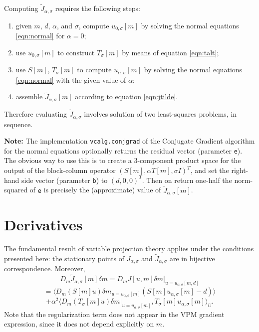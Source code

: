 Computing $\tilde{J}_{\alpha,\sigma}$ requires the following steps:
\begin{enumerate}
\item given $m$, $d$, $\alpha$, and $\sigma$, compute $u_{0,\sigma}[m]$ by solving the normal equations \ref{eqn:normal} for $\alpha=0$;
\item use $u_{0,\sigma}[m]$ to construct $T_{\sigma}[m]$ by means of
  equation \ref{eqn:talt};
\item use $S[m]$, $T_{\sigma}[m]$ to compute $u_{\alpha,\sigma}[m]$ by solving the normal equations \ref{eqn:normal} with the given value of $\alpha$;
\item assemble $\tilde{J}_{\alpha,\sigma}[m]$ according to equation \ref{eqn:jtilde}.
\end{enumerate}

Therefore evaluating $\tilde{J}_{\alpha,\sigma}$ involves solution of
two least-squares problems, in sequence.

{\bf Note:} The implementation {\tt vcalg.conjgrad} of the Conjugate Gradient algorithm for the normal equations optionally returns the residual vector (parameter {\tt e}). The obvious way to use this is to create a 3-component product space for the output of the block-column operator $(S[m],\alpha T[m], \sigma I)^T$, and set the right-hand side vector (parameter {\tt b})
to $(d,0,0)^T$. Then on return one-half the norm-squared of {\tt e} is precisely the (approximate) value of $\tilde{J}_{\alpha,\sigma}[m]$.

\section{Derivatives}
The fundamental result of variable projection theory
\cite[]{GolubPereyra:73} applies under the conditions presented here:
the stationary points of $J_{\alpha,\sigma}$ and
$\tilde{J}_{\alpha,\sigma}$ are in bijective correspondence. Moreover,
\[
D_m\tilde{J}_{\alpha,\sigma}[m]\delta m = D_mJ[u,m]\delta m|_{u =u_{\alpha,\sigma}[m,d]}
\]
\[
  = \langle D_m(S[m]u)\delta m_{u =  u_{\alpha,\sigma}[m]} (S[m]u_{\alpha,\sigma}[m]-d) \rangle
\]
\begin{equation}
+ \alpha^2 \langle D_m(T_{\sigma}[m]u)\delta m|_{u=u_{\alpha,\sigma}[m]},T_{\sigma}[m]u_{\alpha,\sigma}[m]\rangle_U.
\label{eqn:basederiv}
\end{equation}
Note that the regularization term does not appear in the VPM gradient expression, since it does not depend explicitly on $m$.

